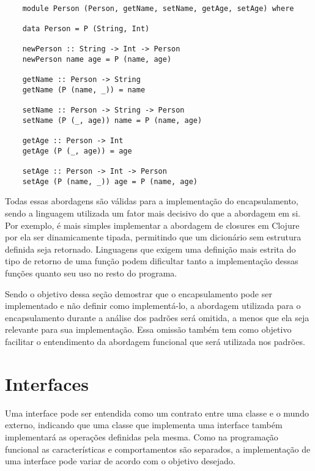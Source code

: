 \begin{lstlisting}[caption={Módulos como forma de encapsulamento},label=modulesencap]
    
    module Person (Person, getName, setName, getAge, setAge) where

    data Person = P (String, Int)

    newPerson :: String -> Int -> Person
    newPerson name age = P (name, age)

    getName :: Person -> String
    getName (P (name, _)) = name

    setName :: Person -> String -> Person
    setName (P (_, age)) name = P (name, age)

    getAge :: Person -> Int
    getAge (P (_, age)) = age

    setAge :: Person -> Int -> Person
    setAge (P (name, _)) age = P (name, age)

\end{lstlisting}

Todas essas abordagens são válidas para a 
implementação do encapsulamento, sendo a 
linguagem utilizada um fator mais decisivo 
do que a abordagem em si. Por exemplo, é 
mais simples implementar a abordagem de closures 
em Clojure por ela ser dinamicamente tipada, 
permitindo que um dicionário sem estrutura 
definida seja retornado. Linguagens que exigem 
uma definição mais estrita do tipo de retorno 
de uma função podem dificultar tanto a 
implementação dessas funções quanto seu uso 
no resto do programa.

Sendo o objetivo dessa seção demostrar que 
o encapsulamento pode ser implementado e 
não definir como implementá-lo, 
a abordagem utilizada para o encapsulamento 
durante a análise dos padrões será 
omitida, a menos que ela seja relevante para 
sua implementação. Essa omissão 
também tem como objetivo facilitar o entendimento 
da abordagem funcional que será utilizada nos padrões.

\section{Interfaces}

Uma interface pode ser entendida como um contrato 
entre uma classe e o mundo externo, indicando que 
uma classe que implementa uma interface também 
implementará as operações definidas 
pela mesma\cite{oracleooconcepts}. 
Como na programação funcional 
as características e comportamentos são separados, 
a implementação de uma interface pode variar de acordo  
com o objetivo desejado.

